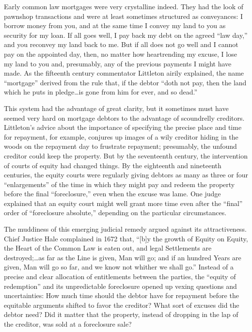 Early common law mortgages were very crystalline indeed. They had the look of
pawnshop transactions and were at least sometimes structured as conveyances: I
borrow money from you, and at the same time I convey my land to you as security
for my loan. If all goes well, I pay back my debt on the agreed ``law day,'' and
you reconvey my land back to me. But if all does not go well and I cannot pay
on the appointed day, then, no matter how heartrending my excuse, I lose my
land to you and, presumably, any of the previous payments I might have made. As
the fifteenth century commentator Littleton airily explained, the name
``mortgage'' derived from the rule that, if the debtor ``doth not pay, then the
land which he puts in pledge\dots is gone from him for ever, and so dead.''

This system had the advantage of great clarity, but it sometimes must have
seemed very hard on mortgage debtors to the advantage of scoundrelly creditors.
Littleton's advice about the importance of specifying the precise place and
time for repayment, for example, conjures up images of a wily creditor hiding
in the woods on the repayment day to frustrate repayment; presumably, the
unfound creditor could keep the property. But by the seventeenth century, the
intervention of courts of equity had changed things. By the eighteenth and
nineteenth centuries, the equity courts were regularly giving debtors as many
as three or four ``enlargements'' of the time in which they might pay and redeem
the property before the final ``foreclosure,'' even when the excuse was lame.
One judge explained that an equity court might well grant more time even after
the ``final'' order of ``foreclosure absolute,'' depending on the particular
circumstances.  

The muddiness of this emerging judicial remedy argued against its
attractiveness. Chief Justice Hale complained in 1672 that, ``[b]y the growth of
Equity on Equity, the Heart of the Common Law is eaten out, and legal
Settlements are destroyed;\ldots as far as the Line is given, Man will go; and
if an hundred Years are given, Man will go so far, and we know not whither we
shall go.'' Instead of a precise and clear allocation of entitlements between
the parties, the ``equity of redemption'' and its unpredictable foreclosure
opened up vexing questions and uncertainties: How much time should the debtor
have for repayment before the equitable arguments shifted to favor the
creditor? What sort of excuses did the debtor need? Did it matter that the
property, instead of dropping in the lap of the creditor, was sold at a
foreclosure sale?


